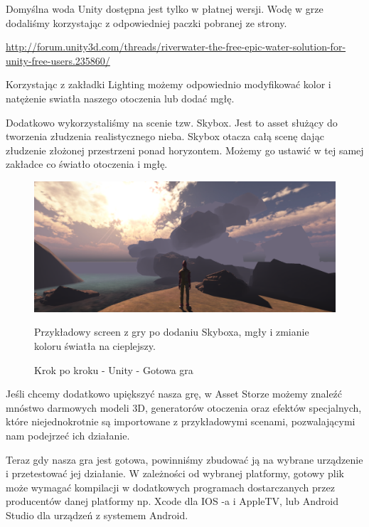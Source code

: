 \documentclass[openright]{xmgr}
\begin{document}
Domyślna woda Unity dostępna jest tylko w płatnej wersji. Wodę w grze dodaliśmy korzystając z odpowiedniej paczki pobranej ze strony.

\href{http://forum.unity3d.com/threads/riverwater-the-free-epic-water-solution-for-unity-free-users.235860/}{http://forum.unity3d.com/threads/riverwater-the-free-epic-water-solution-for-unity-free-users.235860/}

Korzystając z zakładki Lighting możemy odpowiednio modyfikować kolor i natężenie swiatła naszego otoczenia lub dodać mgłę.

Dodatkowo wykorzystaliśmy na scenie tzw. Skybox. Jest to asset służący do tworzenia złudzenia realistycznego nieba. Skybox otacza całą scenę dając złudzenie złożonej przestrzeni ponad horyzontem. Możemy go ustawić w tej samej zakładce co światło otoczenia i mgłę.

\begin{figure}[!htb]
    \begin{center}
    \includegraphics[scale=0.25]{Screeny/UnityKrokPoKroku/gotowa_gra.png}
    \end{center}
    \caption{Krok po kroku - Unity - Gotowa gra}
Przykładowy screen z gry po dodaniu Skyboxa, mgły i zmianie koloru światła na cieplejszy.
\end{figure}

Jeśli chcemy dodatkowo upiększyć nasza grę, w Asset Storze możemy znaleźć mnóstwo darmowych modeli 3D, generatorów otoczenia oraz efektów specjalnych, które niejednokrotnie są importowane z przykładowymi scenami, pozwalającymi nam podejrzeć ich działanie.

Teraz gdy nasza gra jest gotowa, powinniśmy zbudować ją na wybrane urządzenie i przetestować jej działanie. W zależności od wybranej platformy, gotowy plik może wymagać kompilacji w dodatkowych programach dostarczanych przez producentów danej platformy np. Xcode dla IOS -a i AppleTV, lub Android Studio dla urządzeń z systemem Android.
\end{document}
